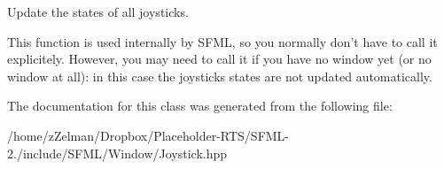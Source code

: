 Update the states of all joysticks. 

This function is used internally by S\-F\-M\-L, so you normally don't have to call it explicitely. However, you may need to call it if you have no window yet (or no window at all)\-: in this case the joysticks states are not updated automatically. 

The documentation for this class was generated from the following file\-:\begin{DoxyCompactItemize}
\item 
/home/z\-Zelman/\-Dropbox/\-Placeholder-\/\-R\-T\-S/\-S\-F\-M\-L-\/2./include/\-S\-F\-M\-L/\-Window/Joystick.\-hpp\end{DoxyCompactItemize}
